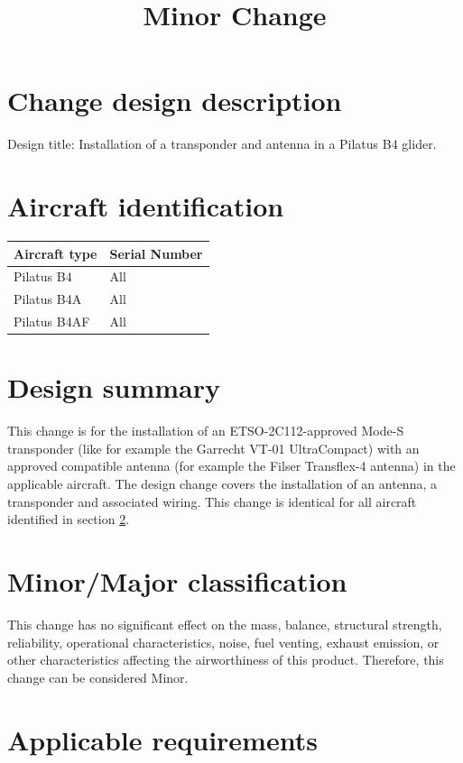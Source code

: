 \documentclass{article}
\begin{document}
\title{Minor Change}
\author{}
\date{}
\maketitle

\section{Change design description}
Design title: Installation of a transponder and antenna in a Pilatus B4 glider.

\section{Aircraft identification}
\label{section:identification}
\begin{tabular}{|l|l|}
\hline
Aircraft type & Serial Number \\
\hline
Pilatus B4 & All \\
Pilatus B4A & All \\
Pilatus B4AF & All \\
\hline
\end{tabular}

\section{Design summary}
This change is for the installation of an ETSO-2C112-approved Mode-S transponder (like for example the Garrecht VT-01 UltraCompact) with an approved compatible antenna (for example the Filser Transflex-4 antenna) in the applicable aircraft. The design change covers the installation of an antenna, a transponder and associated wiring. This change is identical for all aircraft identified in section \ref{section:identification}.

\section{Minor/Major classification}
This change has no significant effect on the mass, balance, structural strength, reliability, operational characteristics, noise, fuel venting, exhaust emission, or other characteristics affecting the airworthiness of this product. Therefore, this change can be considered Minor.

\section{Applicable requirements}
\end{document}
